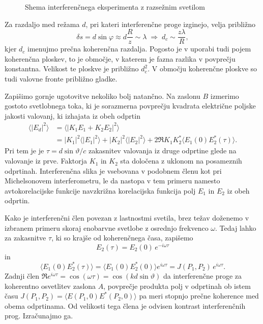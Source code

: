 \begin{figure}[h]
\centering
\def\svgwidth{140truemm} 

\caption{Shema interferenčnega eksperimenta z razsežnim svetilom}
\label{fig:shema-interferenca}
\end{figure}

Za razdaljo med režama $d$, pri kateri interferenčne proge
izginejo, velja približno 
\begin{equation}
\delta s = d\sin\varphi\approx d\frac{R}{z}\sim\lambda\;\Rightarrow\;
d_{c}\sim\frac{z\lambda}{R},\label{eq:prost_koh}
\end{equation}
kjer $d_{c}$ imenujmo prečna koherenčna razdalja. Pogosto je v uporabi
tudi pojem koherenčna ploskev, to je območje, 
v katerem je fazna razlika v povprečju konstantna. Velikost te ploskve je približno $d_{c}^{2}$.
V območju koherenčne ploskve so tudi valovne fronte približno gladke.

Zapišimo gornje ugotovitve nekoliko bolj natančno. Na zaslonu $B$
izmerimo gostoto svetlobnega toka, ki je sorazmerna povprečju kvadrata
električne poljske jakosti valovanj, ki izhajata iz obeh odprtin
\begin{align}
\langle|E{}_{d}|^{2}\rangle & =\langle|K_{1}E_{1}+K_{2}E_{2}|^{2}\rangle\nonumber \\
&=  |K_{1}|^{2}\langle|E_{1}|^{2}\rangle+|K_{2}|^{2}\langle|E_{2}|^{2}\rangle+
2\Re K_{1}K_{2}^{*}\langle E_{1}(0)E_{2}^{*}(\tau)\rangle.
\end{align}
Pri tem je je $\tau=d\sin\vartheta/c$ zakasnitev valovanja iz druge odprtine
glede na valovanje iz prve. Faktorja $K_{1}$ in $K_{2}$ sta določena
z uklonom na posameznih odprtinah.
Interferenčna slika je vsebovana v podobnem členu kot pri Michelsonovem
interferometru, le da nastopa v tem primeru namesto avtokorelacijske funkcije
navzkrižna korelacijska funkcija polj $E_{1}$ in $E_{2}$ iz obeh
odprtin. 

Kako je interferenčni člen povezan z lastnostmi svetila, brez težav
doženemo v izbranem primeru skoraj enobarvne svetlobe z osrednjo frekvenco
$\omega$. Tedaj lahko za zakasnitve $\tau$, ki so krajše
od koherenčnega časa, zapišemo 
\begin{equation}
E_{2}(\tau)=E_{2}(0)\, e^{-i\omega\tau}
\end{equation}
 in 
\begin{equation}
\langle E_{1}(0)E_{2}^{*}(\tau)\rangle=\langle E_{1}(0)E_{2}^{*}(0)\rangle 
e^{i\omega\tau}=J(P_{1},P_{2})\, e^{i\omega\tau}.
\end{equation}
Zadnji člen $\Re e^{i\omega\tau}= \cos(\omega \tau) = \cos(kd\sin\vartheta)$ da interferenčne
proge za koherentno osvetlitev zaslona $A$, povprečje produkta polj
v odprtinah ob istem času $J(P_{1},P_{2})=\langle E(P_{1},0)E^{*}(P_{2},0)\rangle$
pa meri stopnjo prečne koherence med obema odprtinama. Od velikosti
tega člena je odvisen kontrast interferenčnih prog. Izračunajmo ga.

